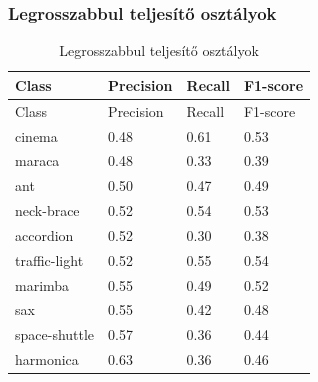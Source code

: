 \subsubsection{Legrosszabbul teljesítő osztályok}
\begin{center}
  \begin{longtable}{llll}
  \caption{Legrosszabbul teljesítő osztályok}\label{tab:phase02_ConvNeXt-Tiny_legrosszabb_osztlyok}\\
  \toprule
  Class & Precision & Recall & F1-score \\
  \midrule
  \endfirsthead
  \toprule
  Class & Precision & Recall & F1-score \\
  \midrule
  \endhead
  cinema & 0.48 & 0.61 & 0.53 \\
  maraca & 0.48 & 0.33 & 0.39 \\
  ant & 0.50 & 0.47 & 0.49 \\
  neck-brace & 0.52 & 0.54 & 0.53 \\
  accordion & 0.52 & 0.30 & 0.38 \\
  traffic-light & 0.52 & 0.55 & 0.54 \\
  marimba & 0.55 & 0.49 & 0.52 \\
  sax & 0.55 & 0.42 & 0.48 \\
  space-shuttle & 0.57 & 0.36 & 0.44 \\
  harmonica & 0.63 & 0.36 & 0.46 \\
  \bottomrule
  \end{longtable}
  \end{center}
  
